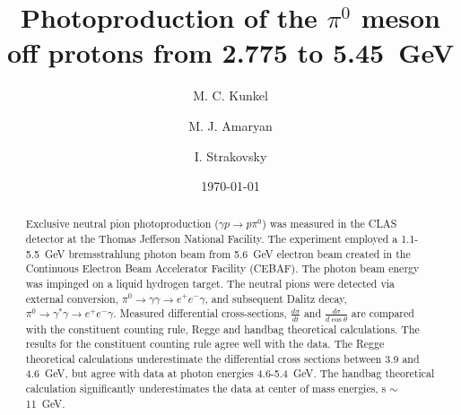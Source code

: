 \documentclass[%
reprint,
showpacs,
preprintnumbers,
amsmath,amssymb,
aps,
]{revtex4-1}
\begin{document}


\title{Photoproduction of the $\pi^0$ meson off protons from 2.775 to 5.45~GeV}
\author{M. C. Kunkel}
\author{M. J. Amaryan}%
\author{I. Strakovsky}%
\date{\today}%

\begin{abstract}
Exclusive neutral pion photoproduction ($\gamma p \rightarrow p \pi^0$) was measured in the CLAS detector at the Thomas Jefferson National Facility. The experiment employed a 1.1-5.5~GeV bremsstrahlung photon beam from 5.6~GeV electron beam created in the Continuous Electron Beam Accelerator Facility (CEBAF). The photon beam energy was impinged on a liquid hydrogen target. The neutral pions were detected via external conversion, $\pi^0 \rightarrow \gamma \gamma \rightarrow e^+e^-\gamma$, and subsequent Dalitz decay, $\pi^0 \rightarrow \gamma^* \gamma \rightarrow e^+e^-\gamma$. Measured differential cross-sections, $\frac{d\sigma}{dt}$ and $\frac{d\sigma}{d\cos \theta}$ are compared with the constituent counting rule, Regge and handbag theoretical calculations. The results for the constituent counting rule agree well with the data. The Regge theoretical calculations underestimate the differential cross sections between 3.9 and 4.6~GeV, but agree with data at photon energies 4.6-5.4~GeV. The handbag theoretical calculation significantly underestimates the data at center of mass energies, s  $\sim$ 11~GeV.  
\end{abstract}
%
\maketitle
%






%

%
\nocite{*}
%
%
\end{document}
